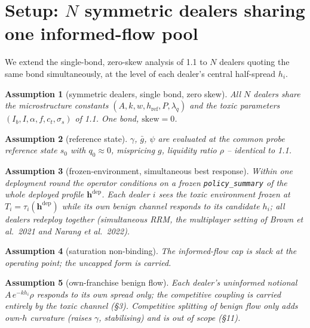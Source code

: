 \documentclass[11pt]{article}
\newtheorem{assumption}{Assumption}
\newcommand{\gbar}{\bar g}
\newcommand{\hrefp}{h_{\mathrm{ref}}}
\newcommand{\code}[1]{\texttt{#1}}
\newcommand{\bvh}{\bm{h}}
\begin{document}
\section{Setup: $N$ symmetric dealers sharing one informed-flow pool}

We extend the single-bond, zero-skew analysis of 1.1 to $N$ dealers quoting the
same bond simultaneously, at the level of each dealer's central half-spread $h_i$.

\begin{assumption}[symmetric dealers, single bond, zero skew]
All $N$ dealers share the microstructure constants $(A,k,w,\hrefp,P,\lambda_q)$ and
the toxic parameters $(I_b,I,\alpha,f,c_t,\sigma_s)$ of 1.1. One bond, $\text{skew}=0$.
\end{assumption}

\begin{assumption}[reference state]
$\gamma$, $\gbar$, $\psi$ are evaluated at the common probe reference state $s_0$
with $q_0\!\approx\!0$, mispricing $g$, liquidity ratio $\rho$ -- identical to 1.1.
\end{assumption}

\begin{assumption}[frozen-environment, simultaneous best response]
Within one deployment round the operator conditions on a \emph{frozen}
\code{policy\_summary} of the whole deployed profile $\bvh^{\mathrm{dep}}$. Each
dealer $i$ sees the toxic environment frozen at $T_i=\tau_i(\bvh^{\mathrm{dep}})$
while its own benign channel responds to its candidate $h_i$; all dealers redeploy
together (simultaneous RRM, the multiplayer setting of Brown et al.\ 2021 and Narang
et al.\ 2022).
\end{assumption}

\begin{assumption}[saturation non-binding]
The informed-flow cap is slack at the operating point; the uncapped form is carried.
\end{assumption}

\begin{assumption}[own-franchise benign flow]
Each dealer's uninformed notional $A\,e^{-kh_i}\rho$ responds to its own spread only;
the competitive coupling is carried entirely by the toxic channel (\S3). Competitive
splitting of benign flow only adds own-$h$ curvature (raises $\gamma$, stabilising)
and is out of scope (\S11).
\end{assumption}
\end{document}
